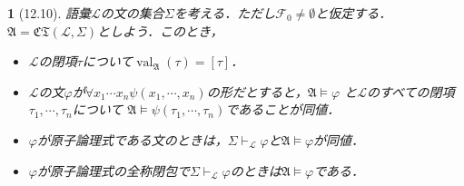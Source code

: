 \documentclass[a4j,10.5pt,oneside,openany]{jsbook}
\theoremstyle{mystyle}
\newtheorem{thm}{\color{DarkMidnightBlue}{定理}}[section]
\newcommand{\val}{\operatorname{val}} %
\begin{document}
	\begin{screen}
		\begin{thm}[12.10]
			語彙$\mathcal{L}$の文の集合$\Sigma$を考える．ただし$\mathcal{F}_{0} \neq \emptyset$と仮定する．
			$\mathfrak{A} = \mathfrak{CT}(\mathcal{L},\Sigma)$としよう．このとき，
			\begin{itemize}
				\item[(1)] $\mathcal{L}$の閉項$\tau$について$\val_{\mathfrak{A}}(\tau)
					= [\tau]$．
				\item[(2)] $\mathcal{L}$の文$\varphi$が$\forall x_{1} \cdots x_{n}
					\psi(x_{1},\cdots,x_{n})$の形だとすると，$\mathfrak{A} \models \varphi$
					と$\mathcal{L}$のすべての閉項$\tau_{1},\cdots,\tau_{n}$について
					$\mathfrak{A} \models \psi(\tau_{1},\cdots,\tau_{n})$であることが同値．
				
				\item[(3)] $\varphi$が原子論理式である文のときは，$\Sigma \vdash_{\mathcal{L}} \varphi$と$\mathfrak{A} \models \varphi$が同値．
				\item[(4)] $\varphi$が原子論理式の全称閉包で$\Sigma \vdash_{\mathcal{L}}
					\varphi$のときは$\mathfrak{A} \models \varphi$である．
			\end{itemize}
		\end{thm}
	\end{screen}
	
\end{document}
